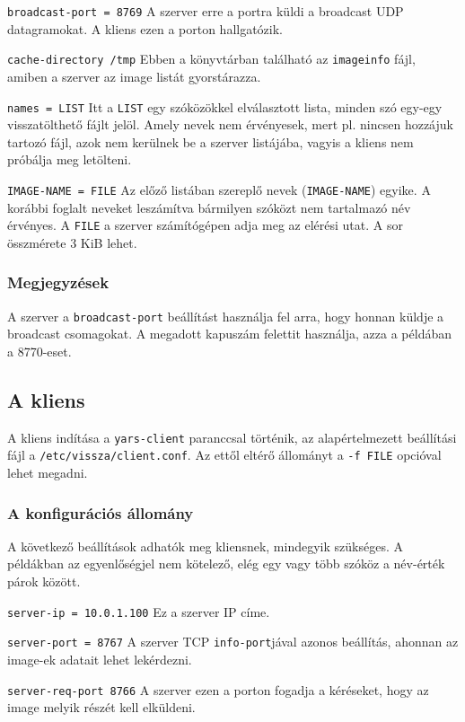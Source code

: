 \documentclass[fleqn,10pt,a4paper,titlepage]{article}
\begin{document}
  \texttt{broadcast-port = 8769} A szerver erre a portra küldi a broadcast UDP datagramokat. A kliens ezen a porton
  hallgatózik. 

  \texttt{cache-directory /tmp} Ebben a könyvtárban található az \texttt{imageinfo} fájl, amiben a szerver az image
  listát gyorstárazza.
  
  \texttt{names = LIST} Itt a \texttt{LIST} egy szóközökkel elválasztott lista, minden szó egy-egy visszatölthető fájlt
  jelöl. Amely nevek nem érvényesek, mert pl. nincsen hozzájuk tartozó fájl, azok nem kerülnek be a szerver listájába,
  vagyis a kliens nem próbálja meg letölteni.
  
  \texttt{IMAGE-NAME = FILE} Az előző listában szereplő nevek (\texttt{IMAGE-NAME}) egyike. A  korábbi foglalt neveket
  leszámítva bármilyen szóközt nem tartalmazó név érvényes. A \texttt{FILE} a szerver számítógépen adja meg az elérési
  utat. A sor összmérete 3 KiB lehet.

  \subsubsection{Megjegyzések}
  A szerver a \texttt{broadcast-port} beállítást használja fel arra, hogy honnan küldje a broadcast csomagokat. A
  megadott kapuszám felettit használja, azza a példában a 8770-eset.
  
  \subsection{A kliens}
  A kliens indítása a \texttt{yars-client} paranccsal történik, az alapértelmezett beállítási fájl a
  \texttt{/etc/vissza/client.conf}. Az ettől eltérő állományt a \texttt{-f FILE} opcióval lehet megadni.
  
  \subsubsection{A konfigurációs állomány}
  A következő beállítások adhatók meg kliensnek, mindegyik szükséges. A példákban az egyenlőségjel nem kötelező, elég
  egy vagy több szóköz a név-érték párok között.
  
  \texttt{server-ip = 10.0.1.100} Ez a szerver IP címe.
  
  \texttt{server-port = 8767} A szerver TCP \texttt{info-port}jával azonos beállítás, ahonnan az image-ek adatait lehet
  lekérdezni.
  
  \texttt{server-req-port 8766} A szerver ezen a porton fogadja a kéréseket, hogy az image melyik részét kell elküldeni.
\end{document}
